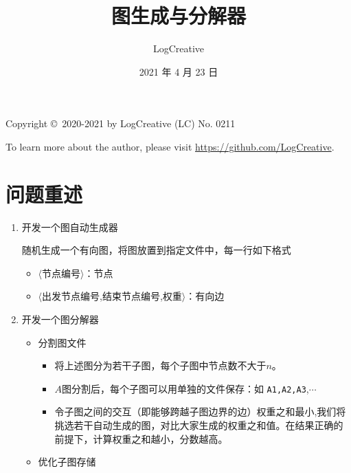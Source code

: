 \documentclass[a4paper,12pt]{article}
\begin{document}
\begin{CJK}{UTF8}{song}
\title{图生成与分解器}
\author{LogCreative}
\date{2021 年 4 月 23 日}
\maketitle
\normalsize

\tableofcontents

\begin{tcolorbox}
  Copyright \copyright\ 2020-2021 by LogCreative  (LC) No. 0211
  
  To learn more about the author, please visit \href{https://github.com/LogCreative}{https://github.com/LogCreative}.
\end{tcolorbox}

\section{问题重述}

\begin{enumerate}
    \item 开发一个图自动生成器
    
    随机生成一个有向图，将图放置到指定文件中，每一行如下格式
    \begin{itemize}
        \item $\langle$节点编号$\rangle$：节点
        \item $\langle$出发节点编号,结束节点编号,权重$\rangle$：有向边
    \end{itemize}

    \item 开发一个图分解器
    \begin{itemize}
        \item 分割图文件
        \begin{itemize}
            \item 将上述图分为若干子图，每个子图中节点数不大于$n$。
            \item $A$图分割后，每个子图可以用单独的文件保存：如 \texttt{A1,A2,A3},$\cdots$
            \item 令子图之间的交互（即能够跨越子图边界的边）权重之和最小,我们将挑选若干自动生成的图，对比大家生成的权重之和值。在结果正确的前提下，计算权重之和越小，分数越高。
        \end{itemize}
        \item 优化子图存储
        

\end{itemize}
\end{enumerate}
\end{CJK}
\end{document}
